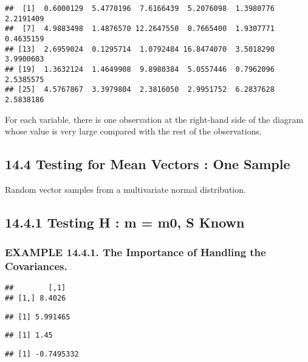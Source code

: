 \documentclass[]{article}
\begin{document}
\begin{verbatim}
##  [1]  0.6000129  5.4770196  7.6166439  5.2076098  1.3980776  2.2191409
##  [7]  4.9883498  1.4876570 12.2647550  0.7665400  1.9307771  0.4635159
## [13]  2.6959024  0.1295714  1.0792484 16.8474070  3.5018290  3.9900603
## [19]  1.3632124  1.4649908  9.8980384  5.0557446  0.7962096  2.5385575
## [25]  4.5767867  3.3979804  2.3816050  2.9951752  6.2837628  2.5838186
\end{verbatim}

For each variable, there is one observation at the right-hand side of
the diagram whose value is very large compared with the rest of the
observations.

\hypertarget{testing-for-mean-vectors-one-sample}{%
\subsection{14.4 Testing for Mean Vectors : One
Sample}\label{testing-for-mean-vectors-one-sample}}

Random vector samples from a multivariate normal distribution.

\hypertarget{testing-h-m-m0-s-known}{%
\subsection{14.4.1 Testing H : m = m0, S
Known}\label{testing-h-m-m0-s-known}}

\hypertarget{example-14.4.1.-the-importance-of-handling-the-covariances.}{%
\subsubsection{EXAMPLE 14.4.1. The Importance of Handling the
Covariances.}\label{example-14.4.1.-the-importance-of-handling-the-covariances.}}

\begin{verbatim}
##        [,1]
## [1,] 8.4026
\end{verbatim}

\begin{verbatim}
## [1] 5.991465
\end{verbatim}

\begin{verbatim}
## [1] 1.45
\end{verbatim}

\begin{verbatim}
## [1] -0.7495332
\end{verbatim}
\end{document}
